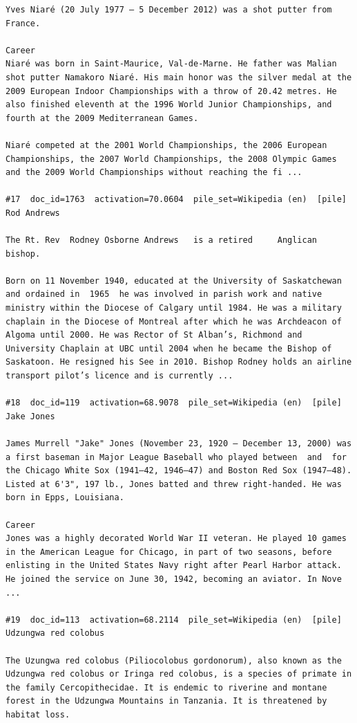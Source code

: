 \begin{verbatim}
Yves Niaré (20 July 1977 – 5 December 2012) was a shot putter from France.

Career
Niaré was born in Saint-Maurice, Val-de-Marne. He father was Malian shot putter Namakoro Niaré. His main honor was the silver medal at the 2009 European Indoor Championships with a throw of 20.42 metres. He also finished eleventh at the 1996 World Junior Championships, and fourth at the 2009 Mediterranean Games.

Niaré competed at the 2001 World Championships, the 2006 European Championships, the 2007 World Championships, the 2008 Olympic Games and the 2009 World Championships without reaching the fi ...

#17  doc_id=1763  activation=70.0604  pile_set=Wikipedia (en)  [pile]
Rod Andrews

The Rt. Rev  Rodney Osborne Andrews   is a retired     Anglican bishop.

Born on 11 November 1940, educated at the University of Saskatchewan and ordained in  1965  he was involved in parish work and native ministry within the Diocese of Calgary until 1984. He was a military chaplain in the Diocese of Montreal after which he was Archdeacon of Algoma until 2000. He was Rector of St Alban’s, Richmond and University Chaplain at UBC until 2004 when he became the Bishop of Saskatoon. He resigned his See in 2010. Bishop Rodney holds an airline transport pilot’s licence and is currently ...

#18  doc_id=119  activation=68.9078  pile_set=Wikipedia (en)  [pile]
Jake Jones

James Murrell "Jake" Jones (November 23, 1920 – December 13, 2000) was a first baseman in Major League Baseball who played between  and  for the Chicago White Sox (1941–42, 1946–47) and Boston Red Sox (1947–48). Listed at 6'3", 197 lb., Jones batted and threw right-handed. He was born in Epps, Louisiana.

Career
Jones was a highly decorated World War II veteran. He played 10 games in the American League for Chicago, in part of two seasons, before enlisting in the United States Navy right after Pearl Harbor attack. He joined the service on June 30, 1942, becoming an aviator. In Nove ...

#19  doc_id=113  activation=68.2114  pile_set=Wikipedia (en)  [pile]
Udzungwa red colobus

The Uzungwa red colobus (Piliocolobus gordonorum), also known as the Udzungwa red colobus or Iringa red colobus, is a species of primate in the family Cercopithecidae. It is endemic to riverine and montane forest in the Udzungwa Mountains in Tanzania. It is threatened by habitat loss.


\end{verbatim}
